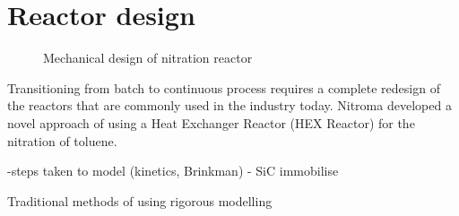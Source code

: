 \section*{Reactor design}
\begin{figure}[h]
    \centering
    \caption{Mechanical design of nitration reactor}
    \label{fig:comsol-S4-CW-X-T}
\end{figure}

Transitioning from batch to continuous process requires a complete redesign of the reactors that are commonly used in the industry today. Nitroma developed a novel approach of using a Heat Exchanger Reactor (HEX Reactor) for the nitration of toluene.

-steps taken to model (kinetics, Brinkman)
- SiC immobilise


Traditional methods of using 
rigorous modelling

